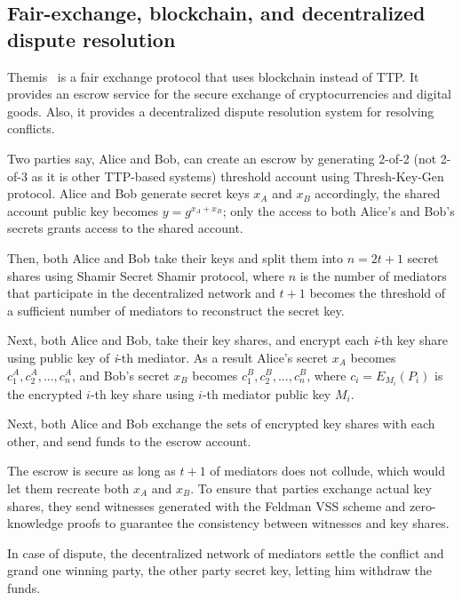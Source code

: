 \documentclass{ieeeaccess}
\begin{document}
\subsection{Fair-exchange, blockchain, and decentralized dispute resolution}
\label{themis-towards-decentralized-escrow-of-cryptocurrencies-without-trusted-third-parties}

Themis~\cite{mengThemisDecentralizedEscrow2019} is a fair exchange protocol that uses blockchain instead of TTP. It provides an escrow service for the secure exchange of cryptocurrencies and digital goods. Also, it provides a decentralized dispute resolution system for resolving conflicts.

Two parties say, Alice and Bob, can create an escrow by generating
2-of-2 (not 2-of-3 as it is other TTP-based systems) threshold account
using Thresh-Key-Gen protocol. Alice and Bob generate secret keys
\(x_A\) and \(x_B\) accordingly, the shared account public key becomes
\(y = g^{x_A+x_B}\); only the access to both Alice's and Bob's secrets
grants access to the shared account.

Then, both Alice and Bob take their keys and split them into
\(n=2t+1\) secret shares using Shamir Secret Shamir protocol, where
\(n\) is the number of mediators that participate in the decentralized
network and \(t+1\) becomes the threshold of a sufficient number of mediators to reconstruct the secret key.

Next, both Alice and Bob, take their key shares, and encrypt each
\textit{i}-th key share using public key of \textit{i}-th mediator. As a result
Alice's secret \(x_A\) becomes \({c^A_1, c^A_2,...,c^A_n}\), and Bob's
secret \(x_B\) becomes \({c^B_1, c^B_2,...,c^B_n}\), where
\(c_i = E_{M_i}(P_i)\) is the encrypted \(i\)-th key share using
\(i\)-th mediator public key \(M_i\).

Next, both Alice and Bob exchange the sets of encrypted key shares with
each other, and send funds to the escrow account.

The escrow is secure as long as \(t+1\) of mediators does not collude,
which would let them recreate both \(x_A\) and \(x_B\). To ensure
that parties exchange actual key shares, they send witnesses
generated with the Feldman VSS scheme and zero-knowledge proofs to guarantee the consistency between witnesses and key shares.

In case of dispute, the decentralized network of mediators settle the conflict and grand one winning party, the other party secret key,
letting him withdraw the funds.
\end{document}
